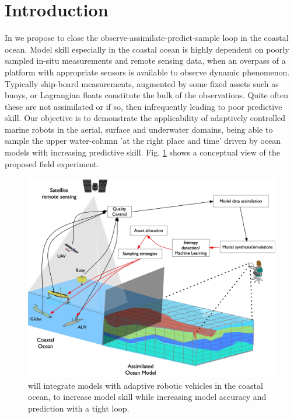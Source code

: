 \section*{Introduction}

In \proj we propose to close the observe-assimilate-predict-sample
loop in the coastal ocean. Model skill especially in the coastal ocean
is highly dependent on poorly sampled in-situ measurements and remote
sensing data, when an overpass of a platform with appropriate sensors
is available to observe dynamic phenomenon. Typically ship-board
measurements, augmented by some fixed assets such as buoys, or
Lagrangian floats constitute the bulk of the observations. Quite often
these are not assimilated or if so, then infrequently leading to poor
predictive skill. Our objective is to demonstrate the applicability of
adaptively controlled marine robots in the aerial, surface and
underwater domains, being able to sample the upper water-column 'at
the right place and time' driven by ocean models with increasing
predictive skill. Fig. \ref{fig:block-diag} shows a conceptual view of
the proposed field experiment.

\begin{figure}[!b]
  \centering
  \includegraphics[scale=0.15]{fig/ensemble.jpg}
  \caption{\proj will integrate models with adaptive robotic vehicles
    in the coastal ocean, to increase model skill while increasing
    model accuracy and prediction with a tight loop.}
  \label{fig:block-diag}
\end{figure}

